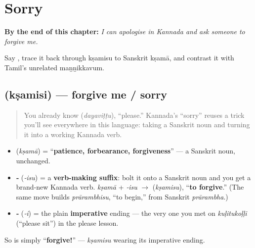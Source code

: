 
\chapter{Sorry}
\label{ch:ka-sorry}

\begin{chapteropening}
\textbf{By the end of this chapter:} \emph{I can apologise in Kannada and ask someone to forgive me.}

Say , trace it back through kṣamisu to Sanskrit kṣamā, and contrast it with Tamil's unrelated maṉṉikkavum.
\end{chapteropening}

\section[\texorpdfstring{\kn{ಕ್ಷಮಿಸಿ} (kṣamisi)}{ಕ್ಷಮಿಸಿ (kṣamisi)}]{ (kṣamisi) — forgive me / sorry}

\label{lesson:KA-C09-kshamisi}



\begin{quote}
You already know \textbf{} (\emph{dayaviṭṭu}), \textquotedblleft{}please.\textquotedblright{} Kannada's \textquotedblleft{}sorry\textquotedblright{} reuses a trick you'll see everywhere in this language: taking a Sanskrit noun and turning it into a working Kannada verb.
\end{quote}

\begin{cousinweb}
\begin{itemize}
\raggedright
  \item \textbf{} (\emph{kṣamā}) = \textquotedblleft{}\textbf{patience, forbearance, forgiveness}\textquotedblright{} — a Sanskrit noun, unchanged.
  \item \textbf{‑} (\emph{‑isu}) = a \textbf{verb-making suffix}: bolt it onto a Sanskrit noun and you get a brand-new Kannada verb. \emph{kṣamā} + \emph{‑isu} $\to$ \textbf{} (\emph{kṣamisu}), \textquotedblleft{}\textbf{to forgive}.\textquotedblright{} (The same move builds \emph{prārambhisu}, \textquotedblleft{}to begin,\textquotedblright{} from Sanskrit \emph{prārambha}.)
  \item \textbf{‑} (\emph{‑i}) = the plain \textbf{imperative} ending — the very one you met on \emph{kuḷitukoḷḷi} (\textquotedblleft{}please sit\textquotedblright{}) in the please lesson.
\end{itemize}

So \textbf{} is simply \textquotedblleft{}\textbf{forgive!}\textquotedblright{} — \emph{kṣamisu} wearing its imperative ending.
\end{cousinweb}

